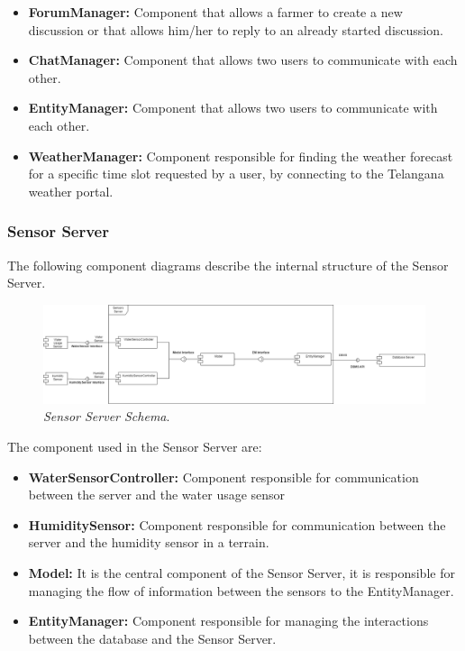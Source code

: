 \begin{itemize}
    \item \textbf{ForumManager:} Component that allows a farmer to create a new discussion or that allows him/her to reply to an already started discussion.
    \item \textbf{ChatManager:} Component that allows two users to communicate with each other.
    \item \textbf{EntityManager:} Component that allows two users to communicate with each other.
    \item \textbf{WeatherManager:} Component responsible for finding the weather forecast for a specific time slot requested by a user, by connecting to the Telangana weather portal.
\end{itemize}

\subsubsection{Sensor Server}
The following component diagrams describe the internal structure of the Sensor Server.\\
\begin{figure}[H]
    \centering
    \includegraphics[scale=0.3]{Images/Components/ComponentDiagram - SensorServer.png}
    \caption{\textit{Sensor Server Schema}.}
\end{figure}
The component used in the Sensor Server are:
\begin{itemize}
    \item \textbf{WaterSensorController:} Component responsible for communication between the server and the water usage sensor
    \item \textbf{HumiditySensor: }Component responsible for communication between the server and the humidity sensor in a terrain.
    \item \textbf{Model: }It is the central component of the Sensor Server, it is responsible for managing the flow of information between the sensors to the EntityManager.
    \item \textbf{EntityManager: }Component responsible for managing the interactions between the database and the Sensor Server.
\end{itemize}
\newpage
